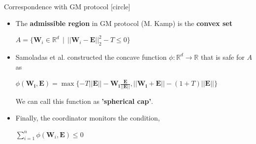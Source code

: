 \begin{frame}{Correspondence with GM protocol}
    [circle]
    \begin{itemize}
        \item{The \textbf{admissible region} in GM protocol (M. Kamp) is the \textbf{convex set}
        \newline
        \begin{center}
            $A=\{\pmb{W}_i\in\mathbb{R}^d\:\:|\:\:||\pmb{W}_i-\pmb{E}||_2^2 - T \leq 0\}$
        \end{center}
        }
        \vspace{0.4cm}
        \item{Samoladas et al. constructed the concave function $\phi:\mathbb{R}^d\rightarrow\mathbb{R}$ that is safe for $A$ as
        \newline
        \begin{center}
            $\phi(\pmb{W_i},\pmb{E}) = \max\{-T||\pmb{E}|| - \pmb{W_i}\frac{\pmb{E}}{\pmb{||E||}}, ||\pmb{W_i}+\pmb{E}|| - (1+T)||\pmb{E}||\}$
        \end{center}
        We can call this function as \textbf{’spherical cap’}.
        }
        \vspace{0.4cm}
        \item{Finally, the coordinator monitors the condition,
        \newline
        \begin{center}
            $\sum_{i=1}^n\phi(\pmb{W}_i,\pmb{E}) \leq 0$
        \end{center}
        }
    \end{itemize}
\end{frame}

